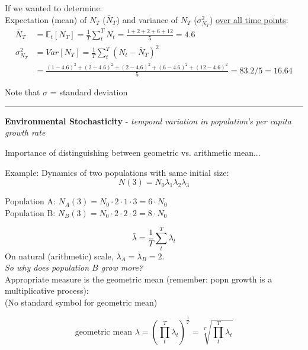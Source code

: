 \documentclass{article}
\begin{document}
If we wanted to determine:\\
Expectation (mean) of $N_T$ ($\bar{N}_T$) and variance of $N_T$ ($\sigma_{N_T}^2$) \underline{over all time points}:
\begin{align*}
	\bar{N}_T &= \mathbb{E}_t[N_T] = \frac{1}{T}\sum_t^T N_t = \frac{1+2+2+6+12}{5} = 4.6\\
	\sigma_{N_T}^2 & = Var[N_T] =  \frac{1}{T}\sum_t^T (N_t - \bar{N}_T)^2\\
	& = \frac{(1-4.6)^2 + (2-4.6)^2 + (2-4.6)^2 + (6-4.6)^2 + (12-4.6)^2}{5} = 83.2/5 = 16.64
\end{align*}

Note that $\sigma$ = standard deviation\\

\rule[0.5ex]{\linewidth}{1pt}

\pagebreak

\textbf{Environmental Stochasticity} - \emph{temporal variation in population's per capita growth rate}

Importance of distinguishing between geometric vs. arithmetic mean...

Example: Dynamics of two populations with same initial size:
\begin{equation*}
	N(3) = N_0 \lambda_1 \lambda_2 \lambda_3
\end{equation*}
\begin{center}
	Population A: $N_A(3) = N_0 \cdot 2 \cdot 1 \cdot 3 = 6 \cdot N_0$\\
	Population B: $N_B(3) = N_0 \cdot 2 \cdot 2 \cdot 2 = 8 \cdot N_0$
\end{center}

\begin{equation*}
	\bar{\lambda} = \frac{1}{T} \sum_t^T \lambda_t
\end{equation*}
On natural (arithmetic) scale, $\bar{\lambda}_A = \bar{\lambda}_B = 2$.\\

\emph{So why does population $B$ grow more?}\\
Appropriate measure is the geometric mean (remember: popn growth is a multiplicative process):\\
(No standard symbol for geometric mean)

\begin{equation*}
	\text{geometric mean }\lambda = \left(\prod_t^T \lambda_t\right)^{\frac{1}{T}} = \sqrt[T]{\prod_t^T \lambda_t}
\end{equation*}
\end{document}
